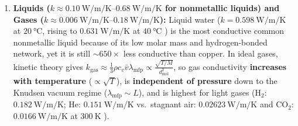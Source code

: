 \begin{enumerate}
  \item \textbf{Liquids ($k \approx \SIrange{0.10}{0.68}{\watt\per\meter\per\kelvin}$ for nonmetallic liquids) and Gases ($k \approx \SIrange{0.006}{0.18}{\watt\per\meter\per\kelvin}$):} Liquid water ($k = \SI{0.598}{\watt\per\meter\per\kelvin}$ at $\SI{20}{\celsius}$, rising to $\SI{0.631}{\watt\per\meter\per\kelvin}$ at $\SI{40}{\celsius}$ ) is the most conductive common nonmetallic liquid because of its low molar mass and hydrogen-bonded network, yet it is still $\sim 650\times$ less conductive than copper. In ideal gases, kinetic theory gives $k_{\mathrm{gas}} \approx \frac{1}{3}\rho c_v \bar{v}\lambda_{\mathrm{mfp}} \propto \frac{\sqrt{T/M}}{d_{\mathrm{mol}}^2}$, so gas conductivity \textbf{increases with temperature} ($\propto \sqrt{T}$), is \textbf{independent of pressure} down to the Knudsen vacuum regime ($\lambda_{\mathrm{mfp}} \sim L$), and is highest for light gases ($\mathrm{H_2}$: $\SI{0.182}{\watt\per\meter\per\kelvin}$; $\mathrm{He}$: $\SI{0.151}{\watt\per\meter\per\kelvin}$ vs.\ stagnant air: $\SI{0.02623}{\watt\per\meter\per\kelvin}$ and $\mathrm{CO_2}$: $\SI{0.0166}{\watt\per\meter\per\kelvin}$ at $\SI{300}{\kelvin}$ ).
\end{enumerate}

